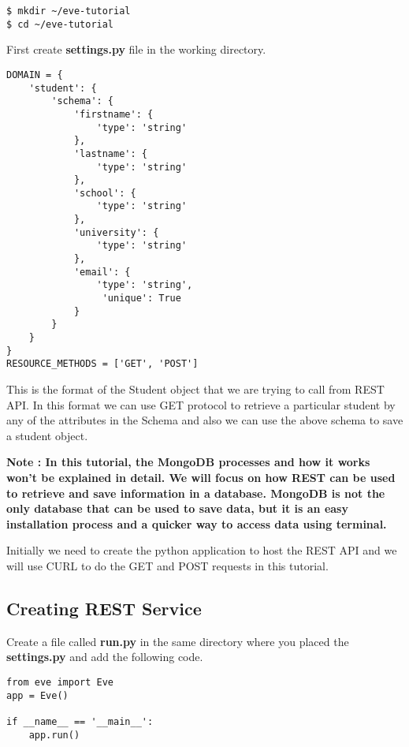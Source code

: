 \documentclass{article}
\begin{document}
\begin{verbatim}
$ mkdir ~/eve-tutorial
$ cd ~/eve-tutorial
\end{verbatim}

First create \textbf{settings.py} file in the working directory. 

\begin{verbatim}
DOMAIN = {
    'student': {
        'schema': {
            'firstname': {
                'type': 'string'
            },
            'lastname': {
                'type': 'string'
            },
            'school': {
                'type': 'string'
            },
            'university': {
                'type': 'string'
            },
            'email': {
                'type': 'string',
                 'unique': True
            }
        }
    }
}
RESOURCE_METHODS = ['GET', 'POST']
\end{verbatim}

This is the format of the Student object that we are trying to call
from REST API. In this format we can use GET protocol to retrieve a
particular student by any of the attributes in the Schema and also we
can use the above schema to save a student object.
\newline

\textbf{Note : In this tutorial, the MongoDB processes and how it
  works won't be explained in detail. We will focus on how REST can be
  used to retrieve and save information in a database. MongoDB is not
  the only database that can be used to save data, but it is an easy
  installation process and a quicker way to access data using
  terminal.  }
\newline

Initially we need to create the python application to host the REST
API and we will use CURL to do the GET and POST requests in this
tutorial.

\subsection{Creating REST Service}

Create a file called \textbf{run.py} in the same directory where you
placed the \textbf{settings.py} and add the following code.

\begin{verbatim}
from eve import Eve
app = Eve()

if __name__ == '__main__':
    app.run()
\end{verbatim}
\end{document}
